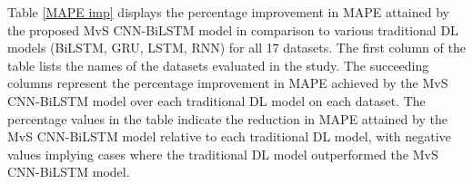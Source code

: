 \documentclass[a4paper,fleqn]{cas-dc}
\begin{document}
    Table \ref{MAPE imp} displays the percentage improvement in MAPE attained by the proposed MvS CNN-BiLSTM model in comparison to various traditional DL models (BiLSTM, GRU, LSTM, RNN) for all 17 datasets. The first column of the table lists the names of the datasets evaluated in the study. The succeeding columns represent the percentage improvement in MAPE achieved by the MvS CNN-BiLSTM model over each traditional DL model on each dataset. The percentage values in the table indicate the reduction in MAPE attained by the MvS CNN-BiLSTM model relative to each traditional DL model, with negative values implying cases where the traditional DL model outperformed the MvS CNN-BiLSTM model.

\end{document}
